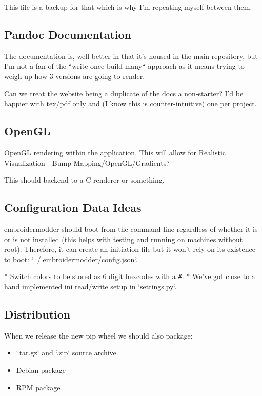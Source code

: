 \documentclass[11pt]{report}
\begin{document}
This file is a backup for that which is why I'm repeating myself between them.

\subsection{Pandoc Documentation}

The documentation is, well better in that it's housed in the main repository,
but I'm not a fan of the ``write once build many`` approach as it means
trying to weigh up how 3 versions are going to render.

Can we treat the website being a duplicate of the docs a non-starter?
I'd be happier with tex/pdf only and (I know this is counter-intuitive) one
per project.

\subsection{OpenGL}

OpenGL rendering within the application. This will allow for
Realistic Visualization - Bump Mapping/OpenGL/Gradients?

This should backend to a C renderer or something.

\subsection{Configuration Data Ideas}

embroidermodder should boot from the command line
regardless of whether it is or is not installed (this helps with testing and
running on machines without root). Therefore, it can create an initiation file
but it won't rely on its existence to boot: `~/.embroidermodder/config.json`.

* Switch colors to be stored as 6 digit hexcodes with a \texttt{\#}.
* We've got close to a hand implemented ini read/write setup in `settings.py`.

\subsection{Distribution}

When we release the new pip wheel we should also package:

\begin{itemize}
\item `.tar.gz` and `.zip` source archive.
\item Debian package
\item RPM package
\end{itemize}
\end{document}
